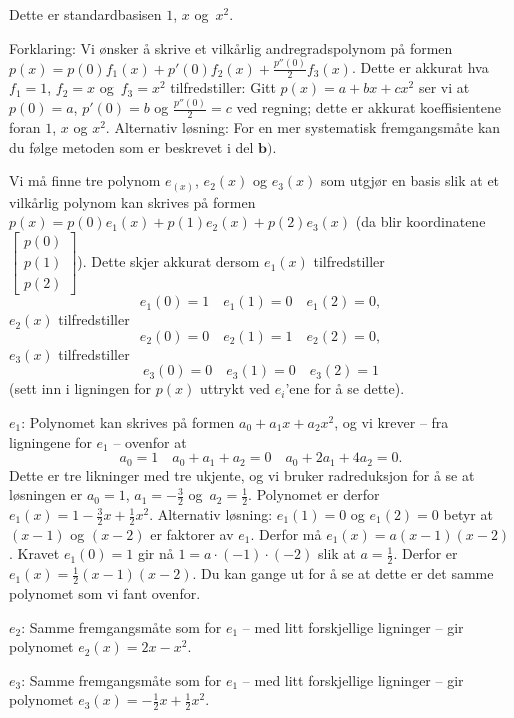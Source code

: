 \begin{losning}

\begin{punkt}
Dette er standardbasisen $1$, $x$ og~$x^2$.

\noindent
Forklaring: Vi ønsker å skrive et vilkårlig andregradspolynom på formen $p(x)=p(0)f_1(x)+p'(0)f_2(x)+\frac{p''(0)}{2}f_3(x)$. Dette er akkurat hva $f_1=1$, $f_2=x$ og~$f_3=x^2$ tilfredstiller: Gitt $p(x)=a+bx+cx^2$ ser vi at $p(0)=a$, $p'(0)=b$ og $\frac{p''(0)}{2}=c$ ved regning; dette er akkurat koeffisientene foran $1$, $x$ og $x^2$. Alternativ løsning: For en mer systematisk fremgangsmåte kan du følge metoden som er beskrevet i del $\textbf{b)}$.
\end{punkt}

\begin{punkt}
Vi må finne tre polynom $e_(x)$, $e_2(x)$ og $e_3(x)$ som utgjør en basis slik at et vilkårlig polynom kan skrives på formen $p(x)=p(0)e_1(x)+p(1)e_2(x)+p(2)e_3(x)$ (da blir koordinatene $\begin{bmatrix}
p(0)\\
p(1)\\
p(2)
\end{bmatrix}$). Dette skjer akkurat dersom $e_1(x)$ tilfredstiller $$e_1(0)=1\quad e_1(1)=0 \quad e_1(2)=0,$$ $e_2(x)$ tilfredstiller $$e_2(0)=0\quad e_2(1)=1 \quad e_2(2)=0,$$ $e_3(x)$ tilfredstiller $$e_3(0)=0\quad e_3(1)=0 \quad e_3(2)=1$$ (sett inn i ligningen for $p(x)$ uttrykt ved $e_i$'ene for å se dette).

\noindent

$e_1$: Polynomet kan skrives på formen $a_0+a_1 x+a_2x^2$, og vi krever -- fra ligningene for $e_1$ -- ovenfor at $$a_0=1\quad a_0+a_1+a_2=0 \quad a_0+2a_1+4a_2=0.$$ Dette er tre likninger med tre ukjente, og vi bruker radreduksjon for å se at løsningen er $a_0=1$, $a_1=-\frac{3}{2}$ og~$a_2=\frac{1}{2}$. Polynomet er derfor $e_1(x)=1-\frac{3}{2}x+\frac{1}{2}x^2$. Alternativ løsning: $e_1(1)=0$ og $e_1(2)=0$ betyr at $(x-1)$ og $(x-2)$ er faktorer av $e_1$. Derfor må $e_1(x)=a(x-1)(x-2)$. Kravet $e_1(0)=1$ gir nå $1=a\cdot(-1)\cdot (-2)$ slik at $a=\frac{1}{2}$. Derfor er $e_1(x)=\frac{1}{2}(x-1)(x-2)$. Du kan gange ut for å se at dette er det samme polynomet som vi fant ovenfor.

\noindent
$e_2$: Samme fremgangsmåte som for $e_1$ -- med litt forskjellige ligninger -- gir polynomet $e_2(x)=2x-x^2$.

\noindent
$e_3$: Samme fremgangsmåte som for $e_1$ -- med litt forskjellige ligninger -- gir polynomet $e_3(x)=-\frac{1}{2}x+\frac{1}{2}x^2$.


\end{punkt}
\end{losning}
